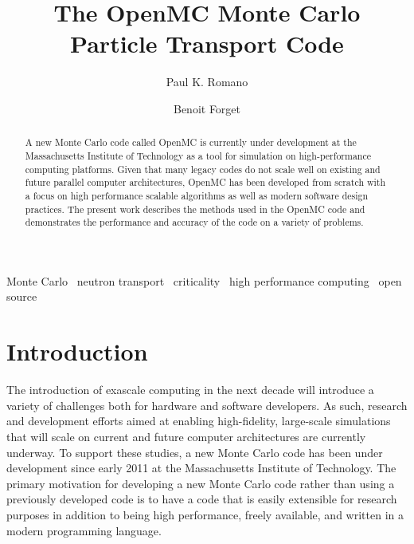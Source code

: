 \documentclass[authoryear,preprint]{elsarticle}
\begin{document}
\begin{frontmatter}

\title{The OpenMC Monte Carlo Particle Transport Code}
\author[mit]{Paul K. Romano}

\author[mit]{Benoit Forget}

\address[mit]{Massachusetts Institute of Technology, Department of Nuclear
  Science and Engineering, 77 Massachusetts Avenue, Building 24-607, Cambridge,
  MA 02141}

\begin{abstract}
A new Monte Carlo code called OpenMC is currently under development at the
Massachusetts Institute of Technology as a tool for simulation on
high-performance computing platforms. Given that many legacy codes do not scale
well on existing and future parallel computer architectures, OpenMC has been
developed from scratch with a focus on high performance scalable algorithms as
well as modern software design practices. The present work describes the methods
used in the OpenMC code and demonstrates the performance and accuracy of the
code on a variety of problems.
\end{abstract}

\begin{keyword}
  Monte Carlo \ neutron transport \ criticality \ high performance computing
  \ open source
\end{keyword}

\end{frontmatter}

\section{Introduction}

The introduction of exascale computing in the next decade will introduce a
variety of challenges both for hardware and software developers. As such,
research and development efforts aimed at enabling high-fidelity, large-scale
simulations that will scale on current and future computer architectures are
currently underway. To support these studies, a new Monte Carlo code has been
under development since early 2011 at the Massachusetts Institute of
Technology. The primary motivation for developing a new Monte Carlo code rather
than using a previously developed code is to have a code that is easily
extensible for research purposes in addition to being high performance, freely
available, and written in a modern programming language.
\end{document}
